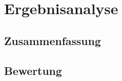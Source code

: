 \section{Ergebnisanalyse}
\label{sec:ergebnisanalyse}

\subsection{Zusammenfassung}
\label{subsec:zusammenfassung}

\subsection{Bewertung}
\label{subsec:bewertung}
